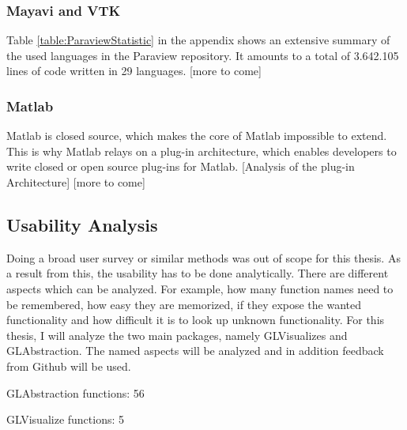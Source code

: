 \subsubsection{Mayavi and VTK}

Table \ref{table:ParaviewStatistic} in the appendix shows an extensive summary of the used languages in the Paraview repository.
It amounts to a total of 3.642.105 lines of code written in 29 languages.
[more to come]

\subsubsection{Matlab}

Matlab is closed source, which makes the core of Matlab impossible to extend.
This is why Matlab relays on a plug-in architecture, which enables developers to write closed or open source plug-ins for Matlab.
[Analysis of the plug-in Architecture]
[more to come]


\subsection{Usability Analysis}
Doing a broad user survey or similar methods was out of scope for this thesis.
As a result from this, the usability has to be done analytically.
There are different aspects which can be analyzed. For example, how many function names need to be remembered, how easy they are memorized, if they expose the wanted functionality and how difficult it is to look up unknown functionality.
For this thesis, I will analyze the two main packages, namely GLVisualizes and GLAbstraction. 
The named aspects will be analyzed and in addition feedback from Github will be used.

GLAbstraction functions: 56

GLVisualize functions: 5

